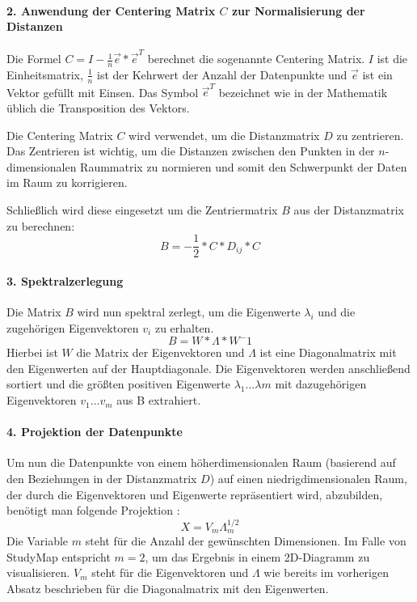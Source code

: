 \paragraph*{2. Anwendung der Centering Matrix $ C $ zur Normalisierung der
Distanzen}
Die Formel $ C = I - \frac{1}{n} \vec{e} * \vec{e}^T $ berechnet die sogenannte Centering Matrix. $ I $ ist die Einheitsmatrix, $ \frac{1}{n} $ ist der Kehrwert der Anzahl der Datenpunkte und $ \vec{e} $ ist ein Vektor gefüllt mit Einsen. Das Symbol $ \vec{e}^T $ bezeichnet wie in der Mathematik üblich die Transposition des Vektors. \parencite{wickelmaier_introduction_2003}

Die Centering Matrix $ C $ wird verwendet, um die Distanzmatrix $ D $ zu
zentrieren. Das Zentrieren ist wichtig, um die Distanzen zwischen den Punkten
in der $n$-dimensionalen Raummatrix zu normieren und somit den Schwerpunkt der
Daten im Raum zu korrigieren. \parencite{wickelmaier_introduction_2003}

Schließlich wird diese eingesetzt um die Zentriermatrix $ B $ aus der
Distanzmatrix zu berechnen:
$$ B = - \frac{1}{2} * C * D_{ij} * C $$

\paragraph*{3. Spektralzerlegung}
Die Matrix $ B $ wird nun spektral zerlegt, um die Eigenwerte $ \lambda_{i} $
und die zugehörigen Eigenvektoren $ v_{i} $ zu erhalten.
$$ B = W * \Lambda * W^-1 $$
Hierbei ist $ W $ die Matrix der Eigenvektoren und $ \Lambda $ ist eine
Diagonalmatrix mit den Eigenwerten auf der Hauptdiagonale. Die Eigenvektoren
werden anschließend sortiert und die größten positiven Eigenwerte
$ \lambda_{1} ... \lambda{m} $ mit dazugehörigen Eigenvektoren
$ v_{1} ... v_{m} $ aus B extrahiert. \parencite{wickelmaier_introduction_2003}

\paragraph*{4. Projektion der Datenpunkte}
Um nun die Datenpunkte von einem höherdimensionalen Raum (basierend auf den
Beziehungen in der Distanzmatrix $ D $) auf einen niedrigdimensionalen Raum,
der durch die Eigenvektoren und Eigenwerte repräsentiert wird, abzubilden,
benötigt man folgende Projektion \parencite{he_classical_2018}:
$$ X = V_m \Lambda^{1/2}_m $$
Die Variable $ m $ steht für die Anzahl der gewünschten Dimensionen. Im Falle
von StudyMap entspricht $ m = 2 $, um das Ergebnis in einem 2D-Diagramm zu
visualisieren. $ V_{m} $ steht für die Eigenvektoren und $ \Lambda $ wie bereits
im vorherigen Absatz beschrieben für die Diagonalmatrix mit den Eigenwerten.
\parencite{wickelmaier_introduction_2003}

